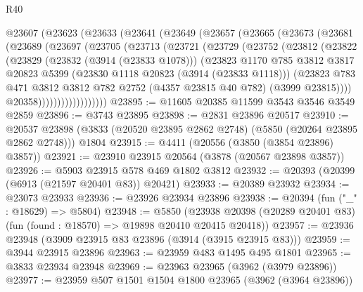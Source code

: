 \begin{lexlean}{R40}
\begin{coremodule}
    @23607
      (@23623
        (@23633
          (@23641
            (@23649
              (@23657
                (@23665
                  (@23673
                    (@23681
                      (@23689
                        (@23697
                          (@23705
                            (@23713
                              (@23721
                                (@23729
                                  (@23752
                                    (@23812
                                      (@23822
                                        (@23829
                                          (@23832 (@3914 (@23833 @1078)))
                                          (@23823
                                            @1170
                                            @785
                                            @3812
                                            @3817
                                            @20823
                                            @5399
                                            (@23830 @1118 @20823 (@3914 (@23833 @1118)))
                                            (@23823
                                              @783
                                              @471
                                              @3812
                                              @3812
                                              @782
                                              @2752
                                              (@4357 @23815 @40 @782)
                                              (@3999 @23815))))
                                        @20358))))))))))))))))))
@23895 := @11605 @20385 @11599 @3543 @3546 @3549 @2859
@23896 := @3743 @23895
@23898 := @2831 @23896 @20517
@23910 := @20537
    @23898
    (@3833 (@20520 @23895 @2862 @2748) (@5850 (@20264 @23895 @2862 @2748)))
    @1804
@23915 := @4411 (@20556 (@3850 (@3854 @23896) @3857))
@23921 := @23910 @23915 @20564 (@3878 (@20567 @23898 @3857))
@23926 := @5903 @23915 @578 @469 @1802 @3812
@23932 := @20393 (@20399 (@6913 (@21597 @20401 @83)) @20421)
@23933 := @20389 @23932
@23934 := @23073 @23933
@23936 := @23926 @23934 @23896
@23938 := @20394 (fun ("_" : @18629) => @5804)
@23948 := @5850
    (@23938 @20398 (@20289 @20401 @83) (fun (found : @18570) => @19898 @20410 @20415 @20418))
@23957 := @23936 @23948 (@3909 @23915 @83 @23896 (@3914 (@3915 @23915 @83)))
@23959 := @3944 @23915 @23896
@23963 := @23959 @483 @1495 @495 @1801
@23965 := @3833 @23934 @23948
@23969 := @23963 @23965 (@3962 (@3979 @23896))
@23977 := @23959 @507 @1501 @1504 @1800 @23965 (@3962 (@3964 @23896))

\end{coremodule}
\end{lexlean}
